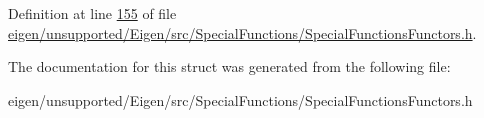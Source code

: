 Definition at line \hyperlink{eigen_2unsupported_2_eigen_2src_2_special_functions_2_special_functions_functors_8h_source_l00155}{155} of file \hyperlink{eigen_2unsupported_2_eigen_2src_2_special_functions_2_special_functions_functors_8h_source}{eigen/unsupported/\+Eigen/src/\+Special\+Functions/\+Special\+Functions\+Functors.\+h}.



The documentation for this struct was generated from the following file\+:\begin{DoxyCompactItemize}
\item 
eigen/unsupported/\+Eigen/src/\+Special\+Functions/\+Special\+Functions\+Functors.\+h\end{DoxyCompactItemize}
